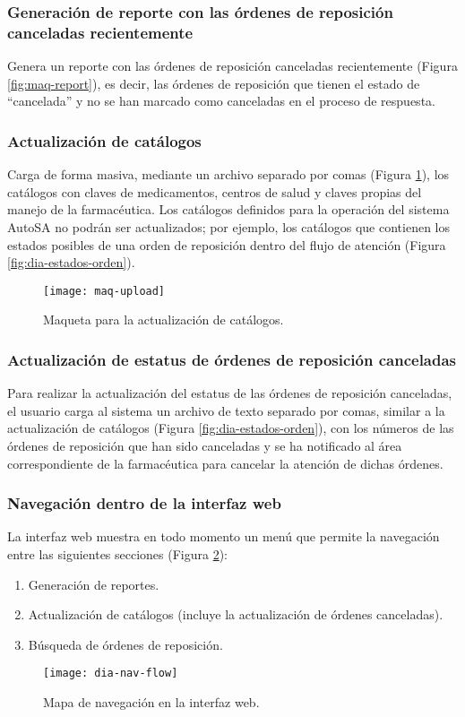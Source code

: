 \subsubsection{Generación de reporte con las órdenes de reposición canceladas recientemente}\label{sec:req-rep-canceladas}
Genera un reporte con las órdenes de reposición canceladas recientemente (Figura \ref{fig:maq-report}), es decir, las órdenes de reposición que tienen el estado de “cancelada” y no se han marcado como canceladas en el proceso de respuesta.

\subsubsection{Actualización de catálogos}\label{sec:req-catalogos}
Carga de forma masiva, mediante un archivo separado por comas (Figura \ref{fig:maq-upload}), los catálogos con claves de medicamentos, centros de salud y claves propias del manejo de la farmacéutica. Los catálogos definidos para la operación del sistema AutoSA no podrán ser actualizados; por ejemplo, los catálogos que contienen los estados posibles de una orden de reposición dentro del flujo de atención (Figura \ref{fig:dia-estados-orden}).
\begin{figure}[h]
  \centering
  \texttt{[image: maq-upload]}
  \caption{Maqueta para la actualización de catálogos.}
  \label{fig:maq-upload}
\end{figure}

\subsubsection{Actualización de estatus de órdenes de reposición canceladas}\label{sec:req-canceladas}
Para realizar la actualización del estatus de las órdenes de reposición canceladas, el usuario carga al sistema un archivo de texto separado por comas, similar a la actualización de catálogos (Figura \ref{fig:dia-estados-orden}), con los números de las órdenes de reposición que han sido canceladas y se ha notificado al área correspondiente de la farmacéutica para cancelar la atención de dichas órdenes.

\subsubsection{Navegación dentro de la interfaz web}\label{sec:req-nav-bar}
La interfaz web muestra en todo momento un menú que permite la navegación entre las siguientes secciones (Figura \ref{fig:dia-nav-flow}):
\begin{enumerate}
  \item Generación de reportes.
  \item Actualización de catálogos (incluye la actualización de órdenes canceladas).
  \item Búsqueda de órdenes de reposición.
\end{enumerate}
\begin{figure}[h]
  \centering
  \texttt{[image: dia-nav-flow]}
  \caption{Mapa de navegación en la interfaz web.}
  \label{fig:dia-nav-flow}
\end{figure}


